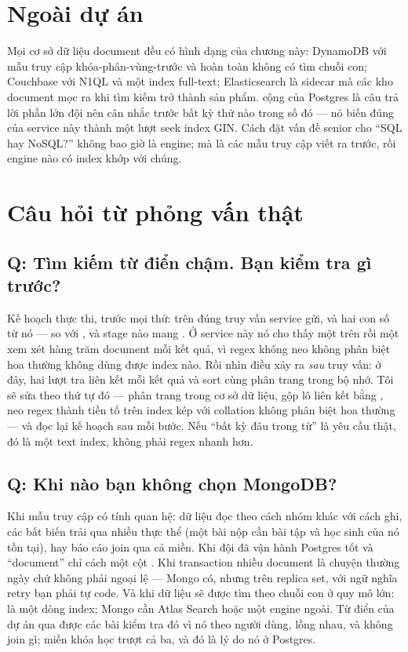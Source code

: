 \section{Ngoài dự án}

Mọi cơ sở dữ liệu document đều có hình dạng của chương này: DynamoDB
với mẫu truy cập khóa-phân-vùng-trước và hoàn toàn không có tìm chuỗi
con; Couchbase với N1QL và một index full-text; Elasticsearch là
sidecar mà các kho document mọc ra khi tìm kiếm trở thành sản phẩm.
 cộng  của Postgres là câu trả lời phần lớn
đội nên cân nhắc trước bất kỳ thứ nào trong số đó --- nó biến đúng
 của service này thành một lượt seek index GIN.
Cách đặt vấn đề senior cho ``SQL hay NoSQL?'' không bao giờ là engine;
mà là các mẫu truy cập viết ra trước, rồi engine nào có index khớp với
chúng.

\section{Câu hỏi từ phỏng vấn thật}

\subsection*{Q: Tìm kiếm từ điển chậm. Bạn kiểm tra gì trước?}

Kế hoạch thực thi, trước mọi thứ: 
trên đúng truy vấn service gửi, và hai con số từ nó ---
 so với , và stage nào mang
. Ở service này nó cho thấy một  trên
 rồi một  xem xét hàng trăm document
mỗi kết quả, vì regex không neo không phân biệt hoa thường không dùng
được index nào. Rồi nhìn điều xảy ra \emph{sau} truy vấn: ở đây, hai
lượt tra liên kết mỗi kết quả và sort cùng phân trang trong bộ nhớ.
Tôi sẽ sửa theo thứ tự đó --- phân trang trong cơ sở dữ liệu, gộp lô
liên kết bằng , neo regex thành tiền tố trên index kép
 với collation không phân biệt hoa
thường --- và đọc lại kế hoạch sau mỗi bước. Nếu ``bất kỳ đâu trong
từ'' là yêu cầu thật, đó là một text index, không phải regex nhanh hơn.

\subsection*{Q: Khi nào bạn không chọn MongoDB?}

Khi mẫu truy cập có tính quan hệ: dữ liệu đọc theo cách nhóm khác với
cách ghi, các bất biến trải qua nhiều thực thể (một bài nộp cần bài tập
và học sinh của nó tồn tại), hay báo cáo join qua cả miền. Khi đội đã
vận hành Postgres tốt và ``document'' chỉ cách một cột .
Khi transaction nhiều document là chuyện thường ngày chứ không phải
ngoại lệ --- Mongo có, nhưng trên replica set, với ngữ nghĩa retry bạn
phải tự code. Và khi dữ liệu sẽ được tìm theo chuỗi con ở quy mô lớn:
 là một dòng index; Mongo cần Atlas Search hoặc một
engine ngoài. Từ điển của dự án qua được các bài kiểm tra đó vì nó theo
người dùng, lồng nhau, và không join gì; miền khóa học trượt cả ba, và
đó là lý do nó ở Postgres.

